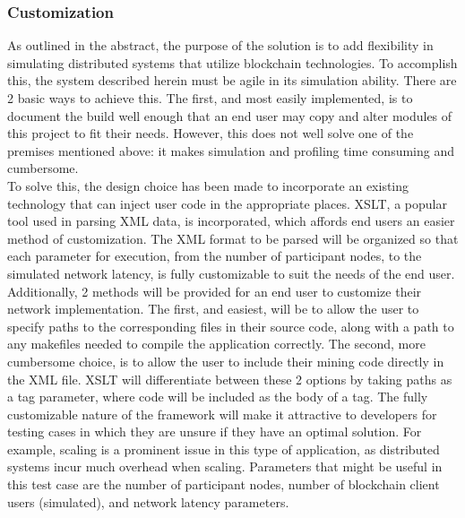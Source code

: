 \documentclass[11pt]{article}
\begin{document}
    \subsubsection{Customization}
    As outlined in the abstract, the purpose of the solution is to add flexibility in simulating distributed systems that
    utilize blockchain technologies.
    To accomplish this, the system described herein must be agile in its simulation ability.
    There are 2 basic ways to achieve this.
    The first, and most easily implemented, is to document the build well enough that an end user may copy and alter
    modules of this project to fit their needs.
    However, this does not well solve one of the premises mentioned above: it makes simulation and profiling time consuming
    and cumbersome.\\
    To solve this, the design choice has been made to incorporate an existing technology that can inject user code in
    the appropriate places.
    XSLT, a popular tool used in parsing XML data, is incorporated, which affords end users an easier
    method of customization.
    The XML format to be parsed will be organized so that each parameter for execution, from the number of participant
    nodes, to the simulated network latency, is fully customizable to suit the needs of the end user.\\
    Additionally, 2 methods will be provided for an end user to customize their network implementation.
    The first, and easiest, will be to allow the user to specify paths to the corresponding files in their source code,
    along with a path to any makefiles needed to compile the application correctly.
    The second, more cumbersome choice, is to allow the user to include their mining code directly in the XML file.
    XSLT will differentiate between these 2 options by taking paths as a tag parameter, where code will be included as
    the body of a tag.
    The fully customizable nature of the framework will make it attractive to developers for testing cases in which they
    are unsure if they have an optimal solution.
    For example, scaling is a prominent issue in this type of application, as distributed systems incur much overhead
    when scaling.
    Parameters that might be useful in this test case are the number of participant nodes, number of blockchain client users
    (simulated), and network latency parameters.
\end{document}
